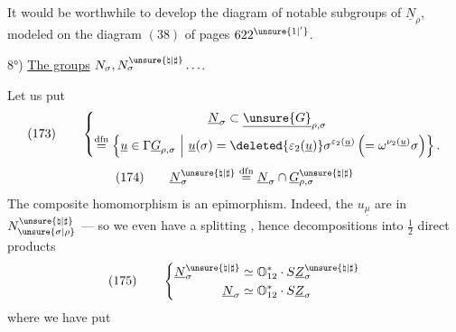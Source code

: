 It would be worthwhile to develop the diagram of notable
subgroups of \(\underline N_\rho\), modeled on
the diagram \((38)\) of pages \(622^{\unsure{1|'}}\).



8°) \uline{The groups} \(N_\sigma,N_\sigma^{\unsure{\natural|\sharp}}\ldots\).

Let us put
\[
(173)\qquad
\left\{
\begin{gathered}
\underline N_\sigma\subset\underline{\unsure{G}}_{\rho,\sigma}\\
\mathrel{\overset{\mathrm{dfn}}{=}}
\left\{\underline u\in\Gamma\underline G_{\rho,\sigma}\ \middle|\
\underline u(\sigma)=
\deleted{\varepsilon_2(\underline u)}
\sigma^{\varepsilon_2(\underline u)}
\left(=\omega^{\nu_2(\underline u)}\sigma\right)\right\}.
\end{gathered}
\right.
\]
\[
(174)\qquad
\underline N_\sigma^{\unsure{\natural|\sharp}}
\mathrel{\overset{\mathrm{dfn}}{=}}
\underline N_\sigma\cap\underline G_{\rho,\sigma}^{\unsure{\natural|\sharp}}
\]
The composite homomorphism
is an epimorphism. Indeed, the \(u_{\underline\mu}\) are in
\(N_{\unsure{\sigma|\rho}}^{\unsure{\natural|\sharp}}\) --- so we even have a splitting
,
hence decompositions into \(\frac12\) direct products
\[
(175)\qquad
\left\{
\begin{aligned}
\underline N_\sigma^{\unsure{\natural|\sharp}}
&\simeq\mathbb O_{12}^{*}\cdot S\underline Z_\sigma^{\unsure{\natural|\sharp}}\\
\underline N_\sigma
&\simeq\mathbb O_{12}^{*}\cdot S\underline Z_\sigma
\end{aligned}
\right.
\]
where we have put
